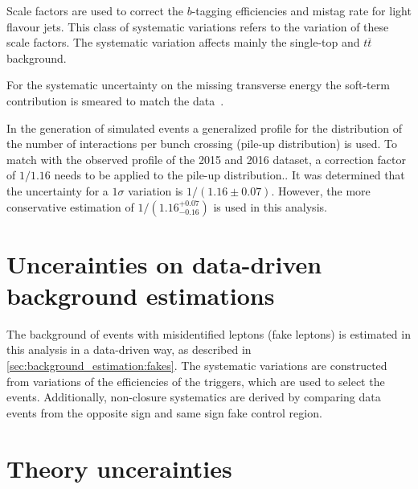 \begin{description}[leftmargin=0cm]
    \item[b-tagging:] Scale factors are used to correct the $b$-tagging efficiencies and mistag rate for light flavour jets.
        This class of systematic variations refers to the variation of these scale factors.
        The systematic variation affects mainly the single-top and $t\overline{t}$ background.
    \item[Transverse missing energy:] For the systematic uncertainty on the missing transverse energy the soft-term
        contribution is smeared to match the data~\cite{METUncertainty}.
    \item[Pile-up reweighting:] In the generation of simulated events a generalized profile for the distribution of the number of interactions
        per bunch crossing (pile-up distribution) is used. To match with the observed profile of the 2015 and 2016 dataset, a correction factor
        of $1/1.16$ needs to be applied to the pile-up distribution..
        It was determined that the uncertainty for a $1\sigma$ variation is $1/(1.16 \pm 0.07)$.
        However, the more conservative estimation of $1/(1.16^{+0.07}_{-0.16})$ is used in this analysis.
\end{description}

\section{Uncerainties on data-driven background estimations}\label{sec:systematics:exp}

The background of events with misidentified leptons (fake leptons) is estimated in this analysis in a data-driven way,
as described in \cref{sec:background_estimation:fakes}.
The systematic variations are constructed from variations of the efficiencies of the triggers, which are used to select the events.
Additionally, non-closure systematics are derived by comparing data events from the opposite sign and same sign fake control region.

\section{Theory uncerainties}\label{sec:systematics:exp}


